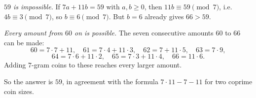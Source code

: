 \emph{$59$ is impossible.} If $7a+11b=59$ with $a,b\ge0$, then $11b\equiv59\pmod7$, i.e. $4b\equiv3\pmod7$, so $b\equiv6\pmod7$. But $b=6$ already gives $66>59$.

\emph{Every amount from $60$ on is possible.} The seven consecutive amounts $60$ to $66$ can be made:
\[60=7\cdot7+11,\quad61=7\cdot4+11\cdot3,\quad62=7+11\cdot5,\quad63=7\cdot9,\]
\[64=7\cdot6+11\cdot2,\quad65=7\cdot3+11\cdot4,\quad66=11\cdot6.\]
Adding $7$-gram coins to these reaches every larger amount.

So the answer is $\boxed{59}$, in agreement with the formula $7\cdot11-7-11$ for two coprime coin sizes.
